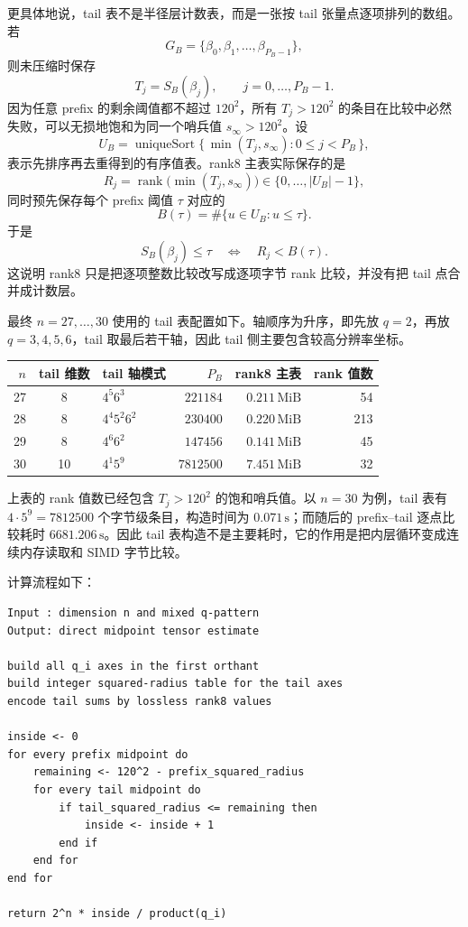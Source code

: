 \documentclass[12pt,a4paper,fontset=none]{ctexart}
\renewcommand{\arraystretch}{1.16}%
\begin{document}
更具体地说，tail 表不是半径层计数表，而是一张按 tail 张量点逐项排列的数组。若
\[
G_B=\{\beta_0,\beta_1,\ldots,\beta_{P_B-1}\},
\]
则未压缩时保存
\[
T_j=S_B(\beta_j),\qquad j=0,\ldots,P_B-1.
\]
因为任意 prefix 的剩余阈值都不超过 \(120^2\)，所有
\(T_j>120^2\) 的条目在比较中必然失败，可以无损地饱和为同一个哨兵值
\(s_\infty>120^2\)。设
\[
U_B=\operatorname{uniqueSort}\{\,\min(T_j,s_\infty):0\le j<P_B\,\},
\]
表示先排序再去重得到的有序值表。rank8 主表实际保存的是
\[
R_j=\operatorname{rank}\bigl(\min(T_j,s_\infty)\bigr)\in\{0,\ldots,|U_B|-1\},
\]
同时预先保存每个 prefix 阈值 \(\tau\) 对应的
\[
B(\tau)=\#\{u\in U_B:u\le \tau\}.
\]
于是
\[
S_B(\beta_j)\le \tau\quad\Longleftrightarrow\quad R_j<B(\tau).
\]
这说明 rank8 只是把逐项整数比较改写成逐项字节 rank 比较，并没有把 tail 点合并成计数层。

最终 \(n=27,\ldots,30\) 使用的 tail 表配置如下。轴顺序为升序，即先放 \(q=2\)，再放
\(q=3,4,5,6\)，tail 取最后若干轴，因此 tail 侧主要包含较高分辨率坐标。

\begin{table}[H]
  \centering
  \normalsize
  \renewcommand{\arraystretch}{1.15}
  \setlength{\tabcolsep}{5pt}
  \begin{tabular}{r c l r r r}
    \toprule
    \(n\) & tail 维数 & tail 轴模式 & \(P_B\) & rank8 主表 & rank 值数 \\
    \midrule
    27 & 8  & \(4^5 6^3\)       & \(221184\)  & \(0.211\,\mathrm{MiB}\) & 54 \\
    28 & 8  & \(4^4 5^2 6^2\)   & \(230400\)  & \(0.220\,\mathrm{MiB}\) & 213 \\
    29 & 8  & \(4^6 6^2\)       & \(147456\)  & \(0.141\,\mathrm{MiB}\) & 45 \\
    30 & 10 & \(4^1 5^9\)       & \(7812500\) & \(7.451\,\mathrm{MiB}\) & 32 \\
    \bottomrule
  \end{tabular}
\end{table}

上表的 rank 值数已经包含 \(T_j>120^2\) 的饱和哨兵值。以 \(n=30\) 为例，tail 表有
\(4\cdot5^9=7812500\) 个字节级条目，构造时间为
\(0.071\,\mathrm{s}\)；而随后的 prefix--tail 逐点比较耗时
\(6681.206\,\mathrm{s}\)。因此 tail 表构造不是主要耗时，它的作用是把内层循环变成连续内存读取和 SIMD 字节比较。

计算流程如下：

\begin{verbatim}
Input : dimension n and mixed q-pattern
Output: direct midpoint tensor estimate

build all q_i axes in the first orthant
build integer squared-radius table for the tail axes
encode tail sums by lossless rank8 values

inside <- 0
for every prefix midpoint do
    remaining <- 120^2 - prefix_squared_radius
    for every tail midpoint do
        if tail_squared_radius <= remaining then
            inside <- inside + 1
        end if
    end for
end for

return 2^n * inside / product(q_i)
\end{verbatim}
\end{document}
